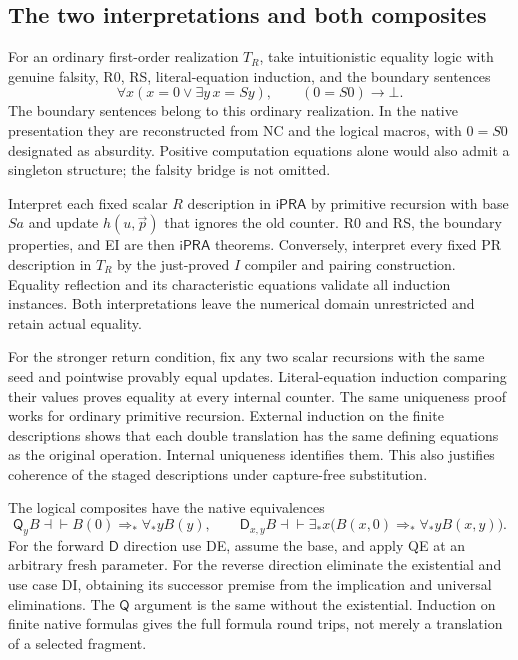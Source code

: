 \documentclass[11pt,letterpaper]{article}
\theoremstyle{definition}\newtheorem{definition}[theorem]{Definition}
\theoremstyle{remark}\newtheorem{remark}[theorem]{Remark}
\newcommand{\ipra}{\mathsf{iPRA}}
\newcommand{\D}{\mathsf D}
\newcommand{\Q}{\mathsf Q}
\begin{document}
\subsection{The two interpretations and both composites}

For an ordinary first-order realization $T_R$, take intuitionistic
equality logic with genuine falsity, R0, RS, literal-equation induction,
and the boundary sentences
\[
 \forall x(x=0\vee\exists y\,x=Sy),\qquad (0=S0)\to\bot.
\]
The boundary sentences belong to this ordinary realization. In the native
presentation they are reconstructed from NC and the logical macros,
with $0=S0$ designated as absurdity. Positive computation equations alone
would also admit a singleton structure; the falsity bridge is not omitted.

Interpret each fixed scalar $R$ description in $\ipra$ by primitive
recursion with base $Sa$ and update $h(u,\vec p)$ that ignores the old
counter. R0 and RS, the boundary properties, and EI are then $\ipra$
theorems. Conversely, interpret every fixed PR description in $T_R$ by
the just-proved $I$ compiler and pairing construction. Equality reflection
and its characteristic equations validate all induction instances.
Both interpretations leave the numerical domain unrestricted and retain
actual equality.

For the stronger return condition, fix any two scalar recursions with
the same seed and pointwise provably equal updates. Literal-equation
induction comparing their values proves equality at every internal
counter. The same uniqueness proof works for ordinary primitive
recursion. External induction on the finite descriptions shows that
each double translation has the same defining equations as the original
operation. Internal uniqueness identifies them. This also justifies
coherence of the staged descriptions under capture-free substitution.

The logical composites have the native equivalences
\[
 \Q_yB\dashv\vdash B(0)\Rightarrow_*\forall_*yB(y),
 \qquad
 \D_{x,y}B\dashv\vdash
 \exists_*x\bigl(B(x,0)\Rightarrow_*\forall_*yB(x,y)\bigr).
\]
For the forward $\D$ direction use DE, assume the base, and apply QE at
an arbitrary fresh parameter. For the reverse direction eliminate the
existential and use case DI, obtaining its successor premise from the
implication and universal eliminations. The $\Q$ argument is the same
without the existential. Induction on finite native formulas gives the
full formula round trips, not merely a translation of a selected fragment.
\end{document}
